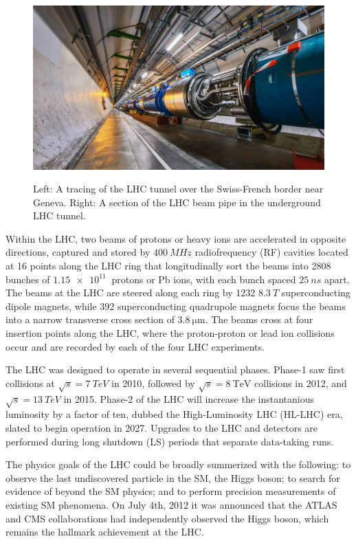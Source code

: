 \begin{figure}[H]
{    \includegraphics[height=\textwidth]{Images/CMS/LHCpipe.jpg}
    }
    \caption{Left: A tracing of the LHC tunnel over the Swiss-French border near Geneva. Right: A section of the LHC beam pipe in the underground LHC tunnel.}
    \label{fig:LHC}
\end{figure}

Within the LHC, two beams of protons or heavy ions are accelerated in opposite directions, captured and stored by $\SI{400}{MHz}$ radiofrequency (RF) cavities located at 16 points along the LHC ring that longitudinally sort the beams into 2808 bunches of $\SI{1.15e11}{}$ protons or Pb ions, with each bunch spaced $\SI{25}{ns}$ apart. The beams at the LHC are steered along each ring by 1232 $\SI{8.3}{T}$ superconducting dipole magnets, while 392 superconducting quadrupole magnets focus the beams into a narrow transverse cross section of $\SI{3.8}{\micro\meter}$. The beams cross at four insertion points along the LHC, where the proton-proton or lead ion collisions occur and are recorded by each of the four LHC experiments.

The LHC was designed to operate in several sequential phases. Phase-1 saw first collisions at $\sqrt{s}=\SI{7}{TeV}$ in 2010, followed by $\sqrt{s}=\SI{8}{\TeV}$ collisions in 2012, and $\sqrt{s}=\SI{13}{TeV}$ in 2015. Phase-2 of the LHC will increase the instantanious luminosity by a factor of ten, dubbed the High-Luminosity LHC (HL-LHC) era, slated to begin operation in 2027. Upgrades to the LHC and detectors are performed during long shutdown (LS) periods that separate data-taking runs.

The physics goals of the LHC could be broadly summerized with the following: to observe the last undiscovered particle in the SM, the Higgs boson; to search for evidence of beyond the SM physics; and to perform precision measurements of existing SM phenomena. On July 4th, 2012 it was announced that the ATLAS and CMS collaborations had independently observed the Higgs boson, which remains the hallmark achievement at the LHC.